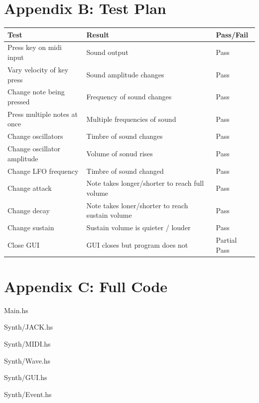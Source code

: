 \documentclass[11pt,a4paper]{article}
\begin{document}
\section{Appendix B: Test Plan}
\begin{tabular}{ | p{5cm} | p{5cm} | l | }
    \hline
    Test & Result & Pass/Fail \\ \hline
    Press key on midi input & Sound output & Pass \\ \hline
    Vary velocity of key press & Sound amplitude changes & Pass \\ \hline
    Change note being pressed & Frequency of sound changes & Pass \\ \hline
    Press multiple notes at once & Multiple frequencies of sound & Pass \\ \hline
    Change oscillators & Timbre of sound changes & Pass \\ \hline
    Change oscillator amplitude & Volume of sonud rises & Pass \\ \hline
    Change LFO frequency & Timbre of sound changed & Pass \\ \hline
    Change attack & Note takes longer/shorter to reach full volume & Pass \\ \hline
    Change decay & Note takes loner/shorter to reach sustain volume & Pass \\ \hline
    Change sustain & Sustain volume is quieter / louder & Pass \\ \hline
    Close GUI & GUI closes but program does not & Partial Pass \\
    \hline
\end{tabular}

\section{Appendix C: Full Code}
Main.hs

Synth/JACK.hs

Synth/MIDI.hs

Synth/Wave.hs

Synth/GUI.hs

Synth/Event.hs

\end{document}
